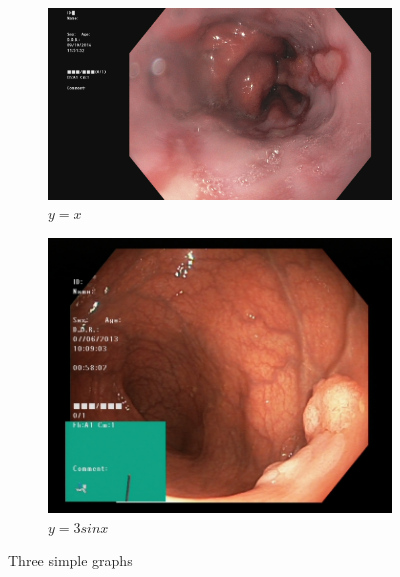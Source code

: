\begin{figure}
     \centering
     \begin{subfigure}[b]{0.6\textwidth}
         \centering
         \includegraphics[width=\textwidth]{experiments/figures/leftframe.jpg}
         \caption{$y=x$}
         \label{fig:y equals x}
     \end{subfigure}
     \hfill
     \begin{subfigure}[b]{0.6\textwidth}
         \centering
         \includegraphics[width=\textwidth]{experiments/figures/greenframe.jpg}
         \caption{$y=3sinx$}
         \label{fig:three sin x}
     \end{subfigure}
        \caption{Three simple graphs}
        \label{fig:three graphs}
\end{figure}


